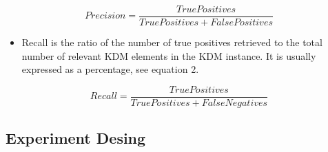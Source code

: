 

 


\begin{equation}
Precision=\frac{True Positives}{True Positives + False Positives}
\end{equation}

\begin{itemize}
\item Recall is the ratio of the number of true positives retrieved to the total number of relevant KDM elements in the KDM instance. It is usually expressed as a percentage, see equation 2.
\end{itemize}

\begin{equation}
Recall=\frac{True Positives}{True Positives + False Negatives}
\end{equation}

\subsection{Experiment Desing}

